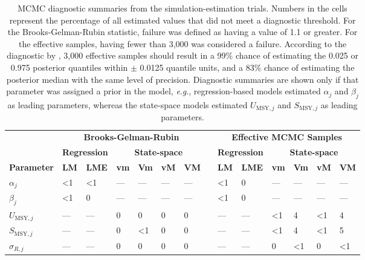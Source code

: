 \documentclass[12pt,]{book}
\theoremstyle{definition}
\theoremstyle{definition}
\theoremstyle{definition}
\theoremstyle{remark}
\begin{document}
\begin{table}

\caption{\label{tab:mcmc-diag-table}MCMC diagnostic summaries from the simulation-estimation trials. Numbers in the cells represent the percentage of all estimated values that did not meet a diagnostic threshold. For the Brooks-Gelman-Rubin statistic, failure was defined as having a value of 1.1 or greater. For the effective samples, having fewer than 3,000 was considered a failure. According to the diagnostic by \cite{raftery-lewis-1992}, 3,000 effective samples should result in a 99\% chance of estimating the 0.025 or 0.975 posterior quantiles within $\pm$ 0.0125 quantile units, and a 83\% chance of estimating the posterior median with the same level of precision. Diagnostic summaries are shown only if that parameter was assigned a prior in the model, \textit{e}.\textit{g}., regression-based models estimated $\alpha_j$ and $\beta_j$ as leading parameters, whereas the state-space models estimated $U_{\text{MSY},j}$ and $S_{\text{MSY},j}$ as leading parameters.}
\centering
\begin{tabular}[t]{llllllllllllll}
\toprule
\multicolumn{1}{c}{\bfseries } & \multicolumn{6}{c}{\bfseries Brooks-Gelman-Rubin} & \multicolumn{1}{c}{\bfseries } & \multicolumn{6}{c}{\bfseries Effective MCMC Samples} \\
\cmidrule(l{2pt}r{2pt}){2-7} \cmidrule(l{2pt}r{2pt}){9-14}
\multicolumn{1}{c}{\bfseries } & \multicolumn{2}{c}{\bfseries Regression} & \multicolumn{4}{c}{\bfseries State-space} & \multicolumn{1}{c}{\bfseries  } & \multicolumn{2}{c}{\bfseries Regression} & \multicolumn{4}{c}{\bfseries State-space} \\
\cmidrule(l{2pt}r{2pt}){2-3} \cmidrule(l{2pt}r{2pt}){4-7} \cmidrule(l{2pt}r{2pt}){9-10} \cmidrule(l{2pt}r{2pt}){11-14}
\textbf{Parameter} & \textbf{LM} & \textbf{LME} & \textbf{vm} & \textbf{Vm} & \textbf{vM} & \textbf{VM} &   & \textbf{LM} & \textbf{LME} & \textbf{vm} & \textbf{Vm} & \textbf{vM} & \textbf{VM}\\
\midrule
$\alpha_j$ & <1 & <1 & --- & --- & --- & --- &  & <1 & 0 & --- & --- & --- & ---\\
$\beta_j$ & <1 & 0 & --- & --- & --- & --- &  & <1 & 0 & --- & --- & --- & ---\\
$U_{\text{MSY},j}$ & --- & --- & 0 & 0 & 0 & 0 &  & --- & --- & <1 & 4 & <1 & 4\\
$S_{\text{MSY},j}$ & --- & --- & 0 & <1 & 0 & 0 &  & --- & --- & <1 & 4 & <1 & 5\\
$\sigma_{R,j}$ & --- & --- & 0 & 0 & 0 & 0 &  & --- & --- & 0 & <1 & 0 & <1\\

\end{tabular}
\end{table}
\end{document}
